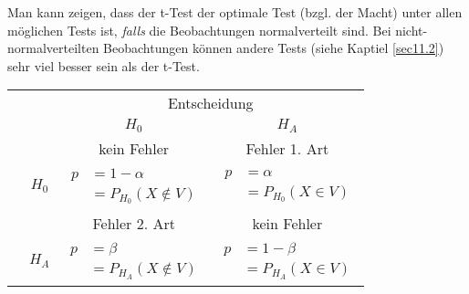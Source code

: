 Man kann zeigen, dass der t-Test der optimale Test (bzgl. der Macht) unter allen möglichen Tests ist, \emph{falls} die Beobachtungen normalverteilt sind. Bei nicht-normalverteilten Beobachtungen können andere Tests (siehe Kaptiel \ref{sec11.2}) sehr viel besser sein als der t-Test.\\[1em]
\begin{tabular}[pos=ttcc]{cc|c|c|}
	\multicolumn{2}{c}{}&\multicolumn{2}{c}{Entscheidung}\\
	&\multicolumn{1}{c}{}&\multicolumn{1}{c}{$H_0$}&\multicolumn{1}{c}{$H_A$}\\
	\cline{3-4}
	\multirow{4}{*}{\rotatebox[]{90}{Wahrheit\quad}}\!\!\!&&kein Fehler&Fehler 1. Art\\
	&$H_0$\!\!&$\!\begin{aligned}p&=1-\alpha\\&=P_{H_0}(X\not\in V) \end{aligned}\!$&$\!\begin{aligned}p&=\alpha\\&=P_{H_0}(X\in V) \end{aligned}\!$\\
	\cline{3-4}
	&&Fehler 2. Art&kein Fehler\\
	&$H_A$\!\!&$\!\begin{aligned}p&=\beta\\&=P_{H_A}(X\not\in V) \end{aligned}\!$&$\!\begin{aligned}p&=1-\beta\\&=P_{H_A}(X\in V) \end{aligned}\!$\\
	\cline{3-4}
\end{tabular}

